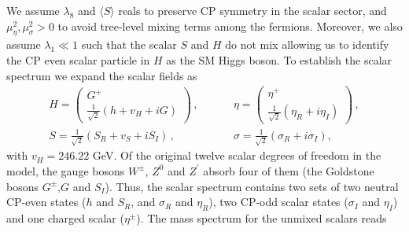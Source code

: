 \documentclass[12pt]{article}
\begin{document}
We assume $\lambda_8$ and $\langle S\rangle$ reals to preserve CP symmetry in the scalar sector, and $\mu^2_\eta,\mu^2_\sigma>0$ to avoid tree-level mixing terms among the fermions. 
Moreover, we also assume $\lambda_1\ll1$  such that the scalar $S$ and $H$ do not mix allowing us to identify the CP even scalar particle in $H$ as the SM Higgs boson. 
To establish the scalar spectrum we expand the scalar fields as
%
\begin{align*}
  H = \begin{pmatrix}G^+ \\ \frac{1}{\sqrt{2}} (h+v_H+iG) \end{pmatrix} \,,&\hspace{1cm}
  \eta = \begin{pmatrix}\eta^{+} \\ \frac{1}{\sqrt{2}}(\eta_R+i\eta_I) \end{pmatrix} \,,\\
  S = \frac{1}{\sqrt{2}} (S_R+v_{S}+iS_I)\,,&\hspace{1cm}\sigma = \frac{1}{\sqrt{2}} (\sigma_R+i\sigma_I),
\end{align*}
%
with $v_H= 246.22$ GeV.  
%
%
Of the original twelve scalar degrees of freedom in the model, the gauge bosons $W^{\pm}$, $Z^{0}$ and $Z^{\prime}$ absorb four of them (the Goldstone bosons $G^{\pm}$,$G$ and $S_{I}$). Thus, the scalar spectrum contains two sets of two neutral CP-even states ($h$ and $S_{R}$,  and $\sigma_{R}$ and $\eta_{R}$), two CP-odd scalar states ($\sigma_{I}$ and $\eta_{I}$) and one charged scalar ($\eta^{\pm}$). 
The mass spectrum for the unmixed scalars reads
\end{document}
